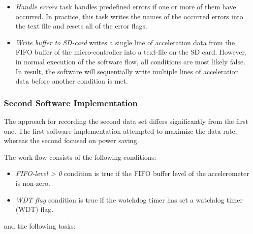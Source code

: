 \documentclass[english,12pt,a4paper,pdftex,elec,utf8]{aaltothesis}
\begin{document}
\begin{itemize}
\item \textit{Handle errors} task handles predefined errors if one or more of them have occurred. In practice, this task writes the names of the occurred errors into the text file and resets all of the error flags.

\item \textit{Write buffer to SD-card} writes a single line of acceleration data from the FIFO buffer of the micro-controller into a text-file on the SD card. However, in normal execution of the software flow, all conditions are most likely false. In result, the software will sequentially write multiple lines of acceleration data before another condition is met.
\end{itemize}





\subsubsection*{Second Software Implementation}\label{seconddatasetconfigurations}



The approach for recording the second data set differs significantly from the first one. The first software implementation attempted to maximize the data rate, whereas the second focused on power saving. 


The work flow consists of the following conditions:
\begin{itemize}
\item \textit{FIFO-level > 0} condition is true if the FIFO buffer level of the accelerometer is non-zero.

\item \textit{WDT flag} condition is true if the watchdog timer has set a watchdog timer (WDT) flag.
\end{itemize}
and the following tasks:
\end{document}
